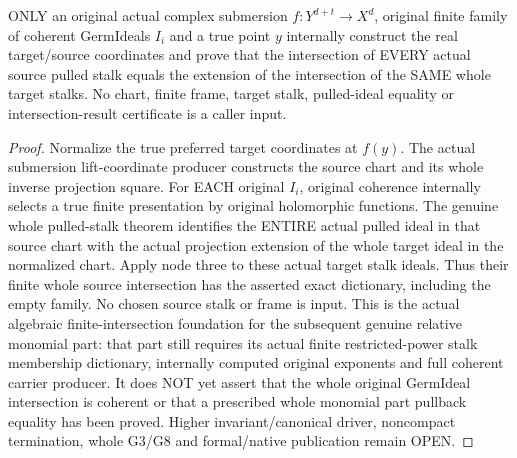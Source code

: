\begin{theorem}
\label{hir:submersion-finite-intersection-original-smooth-stalks}
\leanok
ONLY an original actual complex submersion $f:Y^{d+t}\to X^d$, original
finite family of coherent GermIdeals $I_i$ and a true point $y$ internally
construct the real target/source coordinates and prove that the intersection
of EVERY actual source pulled stalk equals the extension of the intersection
of the SAME whole target stalks. No chart, finite frame, target stalk,
pulled-ideal equality or intersection-result certificate is a caller input.
\end{theorem}
\begin{proof}
Normalize the true preferred target coordinates at $f(y)$. The actual
submersion lift-coordinate producer constructs the source chart and its
whole inverse projection square. For EACH original $I_i$, original coherence
internally selects a true finite presentation by original holomorphic
functions. The genuine whole pulled-stalk theorem identifies the ENTIRE
actual pulled ideal in that source chart with the actual projection extension
of the whole target ideal in the normalized chart. Apply node three to
these actual target stalk ideals. Thus their finite whole source
intersection has the asserted exact dictionary, including the empty family.
No chosen source stalk or frame is input. This is the actual algebraic
finite-intersection foundation for the subsequent genuine relative monomial
part: that part still requires its actual finite restricted-power stalk
membership dictionary, internally computed original exponents and full
coherent carrier producer. It does NOT yet assert that the whole original
GermIdeal intersection is coherent or that a prescribed whole monomial part
pullback equality has been proved. Higher invariant/canonical driver,
noncompact termination, whole G3/G8 and formal/native publication remain OPEN.
\end{proof}
